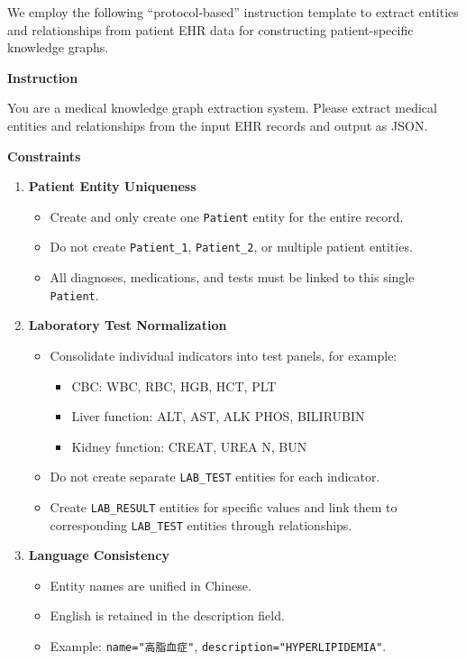 \documentclass[11pt]{article}
\providecommand{\tightlist}{\setlength{\itemsep}{0pt}\setlength{\parskip}{0pt}}
\begin{document}
We employ the following ``protocol-based'' instruction template to extract entities and relationships from patient EHR data for constructing patient-specific knowledge graphs.

\textbf{Instruction}

You are a medical knowledge graph extraction system. Please extract medical entities and relationships from the input EHR records and output as JSON.

\textbf{Constraints}

\begin{enumerate}
\def\labelenumi{\arabic{enumi}.}
\tightlist
\item
  \textbf{Patient Entity Uniqueness}

  \begin{itemize}
  \tightlist
  \item
    Create and only create one \texttt{Patient} entity for the entire record.
  \item
    Do not create \texttt{Patient\_1}, \texttt{Patient\_2}, or multiple patient entities.
  \item
    All diagnoses, medications, and tests must be linked to this single \texttt{Patient}.
  \end{itemize}
\item
  \textbf{Laboratory Test Normalization}

  \begin{itemize}
  \tightlist
  \item
    Consolidate individual indicators into test panels, for example:

    \begin{itemize}
    \tightlist
    \item
      CBC: WBC, RBC, HGB, HCT, PLT
    \item
      Liver function: ALT, AST, ALK PHOS, BILIRUBIN
    \item
      Kidney function: CREAT, UREA N, BUN
    \end{itemize}
  \item
    Do not create separate \texttt{LAB\_TEST} entities for each indicator.
  \item
    Create \texttt{LAB\_RESULT} entities for specific values and link them to corresponding \texttt{LAB\_TEST} entities through relationships.
  \end{itemize}
\item
  \textbf{Language Consistency}

  \begin{itemize}
  \tightlist
  \item
    Entity names are unified in Chinese.
  \item
    English is retained in the description field.
  \item
    Example: \texttt{name="高脂血症"}, \texttt{description="HYPERLIPIDEMIA"}.
  \end{itemize}
\end{enumerate}
\end{document}
